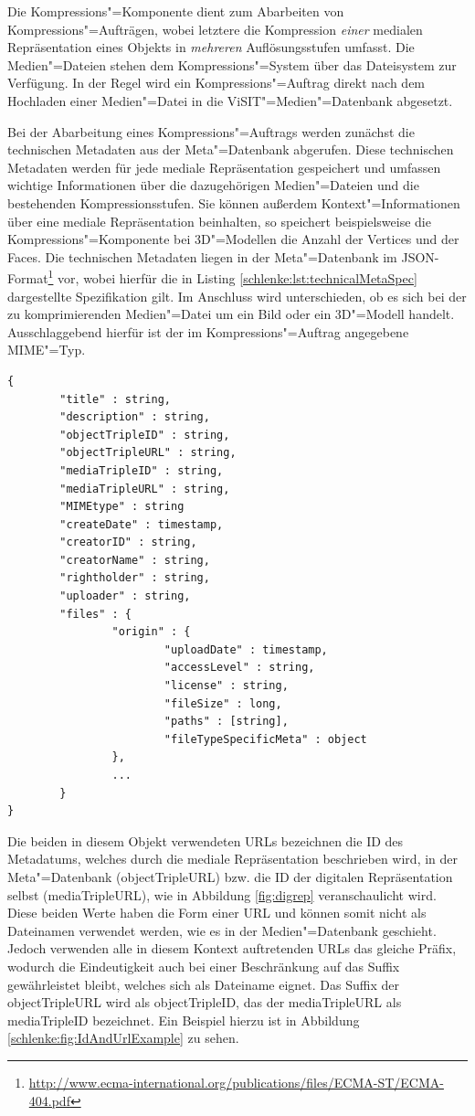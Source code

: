 Die Kompressions"=Komponente dient zum Abarbeiten von Kompressions"=Aufträgen, wobei letztere die Kompression \emph{einer} medialen Repräsentation eines Objekts in \emph{mehreren} Auflösungsstufen umfasst. Die Medien"=Dateien stehen dem Kompressions"=System über das Dateisystem zur Verfügung. In der Regel wird ein Kompressions"=Auftrag direkt nach dem Hochladen einer Medien"=Datei in die ViSIT"=Medien"=Datenbank abgesetzt.

Bei der Abarbeitung eines Kompressions"=Auftrags werden zunächst die technischen Metadaten aus der Meta"=Datenbank abgerufen. Diese technischen Metadaten werden für jede mediale Repräsentation gespeichert und umfassen wichtige Informationen über die dazugehörigen Medien"=Dateien und die bestehenden Kompressionsstufen. Sie können außerdem Kontext"=Informationen über eine mediale Repräsentation beinhalten, so speichert beispielsweise die Kompressions"=Komponente bei 3D"=Modellen die Anzahl der Vertices und der Faces. Die technischen Metadaten liegen in der Meta"=Datenbank im JSON-Format\footnote{\url{http://www.ecma-international.org/publications/files/ECMA-ST/ECMA-404.pdf}} vor, wobei hierfür die in Listing \ref{schlenke:lst:technicalMetaSpec} dargestellte Spezifikation gilt. Im Anschluss wird unterschieden, ob es sich bei der zu komprimierenden Medien"=Datei um ein Bild oder ein 3D"=Modell handelt. Ausschlaggebend hierfür ist der im Kompressions"=Auftrag angegebene MIME"=Typ.

\begin{lstlisting}[float, caption={Spezifikation des die technischen Metadaten beinhaltenden JSON-Objekts},label=schlenke:lst:technicalMetaSpec]
{
		"title"	: string,
		"description" : string,
		"objectTripleID" : string,
		"objectTripleURL" : string,
		"mediaTripleID" : string,
		"mediaTripleURL" : string,
		"MIMEtype" : string
		"createDate" : timestamp,
		"creatorID" : string,
		"creatorName" : string,
		"rightholder" : string,
		"uploader" : string, 
		"files" : {
				"origin" : {
						"uploadDate" : timestamp,
						"accessLevel" : string,
						"license" : string,
						"fileSize" : long,
						"paths" : [string],
						"fileTypeSpecificMeta" : object
				},
				...
		}
}
\end{lstlisting}

Die beiden in diesem Objekt verwendeten URLs bezeichnen die ID des Metadatums, welches durch die mediale Repräsentation beschrieben wird, in der Meta"=Datenbank ({\ttfamily object\-Triple\-URL}) bzw. die ID der digitalen Repräsentation selbst ({\ttfamily media\-Triple\-URL}), wie in Abbildung \autoref{fig:digrep} veranschaulicht wird. Diese beiden Werte haben die Form einer URL und können somit nicht als Dateinamen verwendet werden, wie es in der Medien"=Datenbank geschieht. Jedoch verwenden alle in diesem Kontext auftretenden URLs das gleiche Präfix, wodurch die Eindeutigkeit auch bei einer Beschränkung auf das Suffix gewährleistet bleibt, welches sich als Dateiname eignet. Das Suffix der {\ttfamily object\-Triple\-URL} wird als {\ttfamily object\-Triple\-ID}, das der {\ttfamily media\-Triple\-URL} als {\ttfamily media\-Triple\-ID} bezeichnet. Ein Beispiel hierzu ist in Abbildung \ref{schlenke:fig:IdAndUrlExample} zu sehen.

